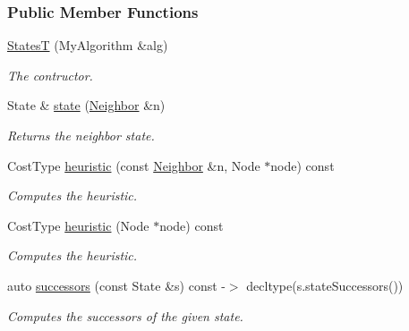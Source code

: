 \subsubsection*{Public Member Functions}
\begin{DoxyCompactItemize}
\item 
\hyperlink{structslb_1_1ext_1_1policy_1_1generator_1_1StatesT_a31e1dbd50128ac105774047963a609ea}{StatesT} (My\+Algorithm \&alg)
\begin{DoxyCompactList}\small\item\em The contructor. \end{DoxyCompactList}\item 
State \& \hyperlink{structslb_1_1ext_1_1policy_1_1generator_1_1StatesT_a2a27494946b73fcd9735cdc7515cab74}{state} (\hyperlink{structslb_1_1ext_1_1policy_1_1generator_1_1StatesT_aabbc05d367ac5da87108f453240e6a32}{Neighbor} \&n)
\begin{DoxyCompactList}\small\item\em Returns the neighbor state. \end{DoxyCompactList}\item 
Cost\+Type \hyperlink{structslb_1_1ext_1_1policy_1_1generator_1_1StatesT_ae0e0c092fbdd54178dfd1a4e533bf18a}{heuristic} (const \hyperlink{structslb_1_1ext_1_1policy_1_1generator_1_1StatesT_aabbc05d367ac5da87108f453240e6a32}{Neighbor} \&n, Node $\ast$node) const 
\begin{DoxyCompactList}\small\item\em Computes the heuristic. \end{DoxyCompactList}\item 
Cost\+Type \hyperlink{structslb_1_1ext_1_1policy_1_1generator_1_1StatesT_ae04718f6da6b4a0c10ba542f0aad853a}{heuristic} (Node $\ast$node) const 
\begin{DoxyCompactList}\small\item\em Computes the heuristic. \end{DoxyCompactList}\item 
auto \hyperlink{structslb_1_1ext_1_1policy_1_1generator_1_1StatesT_a21106503819e2761f4797cb654e34356}{successors} (const State \&s) const -\/$>$ decltype(s.\+state\+Successors())
\begin{DoxyCompactList}\small\item\em Computes the successors of the given state. \end{DoxyCompactList}\end{DoxyCompactItemize}
